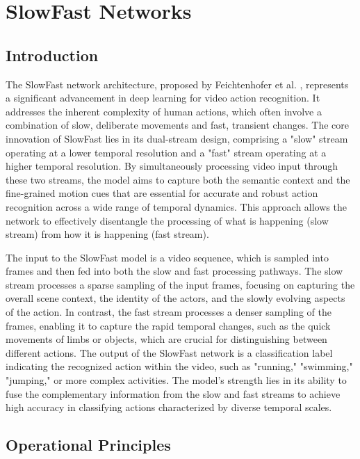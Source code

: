 
\section{SlowFast Networks}

\subsection{Introduction}

The SlowFast network architecture, proposed by Feichtenhofer et al. \cite{feichtenhofer2019slowfast}, represents a significant advancement in deep learning for video action recognition. It addresses the inherent complexity of human actions, which often involve a combination of slow, deliberate movements and fast, transient changes. The core innovation of SlowFast lies in its dual-stream design, comprising a "slow" stream operating at a lower temporal resolution and a "fast" stream operating at a higher temporal resolution. By simultaneously processing video input through these two streams, the model aims to capture both the semantic context and the fine-grained motion cues that are essential for accurate and robust action recognition across a wide range of temporal dynamics. This approach allows the network to effectively disentangle the processing of what is happening (slow stream) from how it is happening (fast stream).

The input to the SlowFast model is a video sequence, which is sampled into frames and then fed into both the slow and fast processing pathways. The slow stream processes a sparse sampling of the input frames, focusing on capturing the overall scene context, the identity of the actors, and the slowly evolving aspects of the action. In contrast, the fast stream processes a denser sampling of the frames, enabling it to capture the rapid temporal changes, such as the quick movements of limbs or objects, which are crucial for distinguishing between different actions. The output of the SlowFast network is a classification label indicating the recognized action within the video, such as "running," "swimming," "jumping," or more complex activities. The model's strength lies in its ability to fuse the complementary information from the slow and fast streams to achieve high accuracy in classifying actions characterized by diverse temporal scales.

\subsection{Operational Principles}

